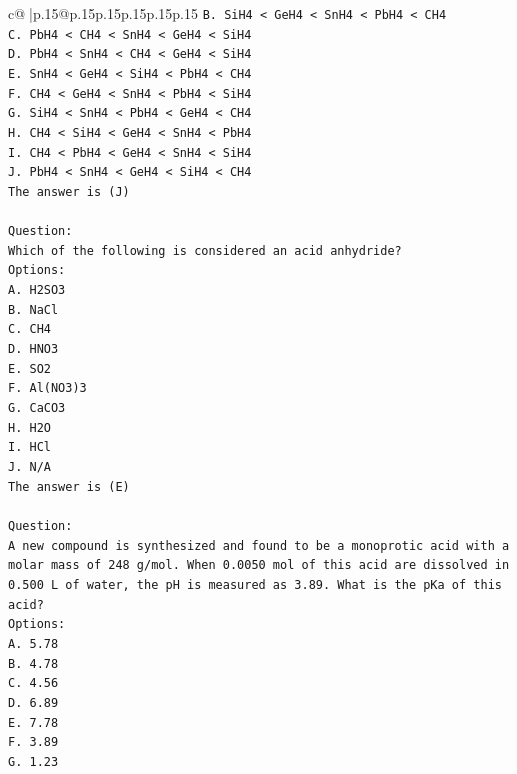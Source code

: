 \documentclass{article}
\begin{document}
{\begin{supertabular}{c@{$\;$}|p{.15\linewidth}@{}p{.15\linewidth}p{.15\linewidth}p{.15\linewidth}p{.15\linewidth}p{.15\linewidth}}
{{{\texttt{B. SiH4 < GeH4 < SnH4 < PbH4 < CH4} \\
\texttt{C. PbH4 < CH4 < SnH4 < GeH4 < SiH4} \\
\texttt{D. PbH4 < SnH4 < CH4 < GeH4 < SiH4} \\
\texttt{E. SnH4 < GeH4 < SiH4 < PbH4 < CH4} \\
\texttt{F. CH4 < GeH4 < SnH4 < PbH4 < SiH4} \\
\texttt{G. SiH4 < SnH4 < PbH4 < GeH4 < CH4} \\
\texttt{H. CH4 < SiH4 < GeH4 < SnH4 < PbH4} \\
\texttt{I. CH4 < PbH4 < GeH4 < SnH4 < SiH4} \\
\texttt{J. PbH4 < SnH4 < GeH4 < SiH4 < CH4} \\
\texttt{The answer is (J)} \\
\\ 
\texttt{Question:} \\
\texttt{Which of the following is considered an acid anhydride?} \\
\texttt{Options:} \\
\texttt{A. H2SO3} \\
\texttt{B. NaCl} \\
\texttt{C. CH4} \\
\texttt{D. HNO3} \\
\texttt{E. SO2} \\
\texttt{F. Al(NO3)3} \\
\texttt{G. CaCO3} \\
\texttt{H. H2O} \\
\texttt{I. HCl} \\
\texttt{J. N/A} \\
\texttt{The answer is (E)} \\
\\ 
\texttt{Question:} \\
\texttt{A new compound is synthesized and found to be a monoprotic acid with a molar mass of 248 g/mol. When 0.0050 mol of this acid are dissolved in 0.500 L of water, the pH is measured as 3.89. What is the pKa of this acid?} \\
\texttt{Options:} \\
\texttt{A. 5.78} \\
\texttt{B. 4.78} \\
\texttt{C. 4.56} \\
\texttt{D. 6.89} \\
\texttt{E. 7.78} \\
\texttt{F. 3.89} \\
\texttt{G. 1.23} \\
}}}
\end{supertabular}}
\end{document}
